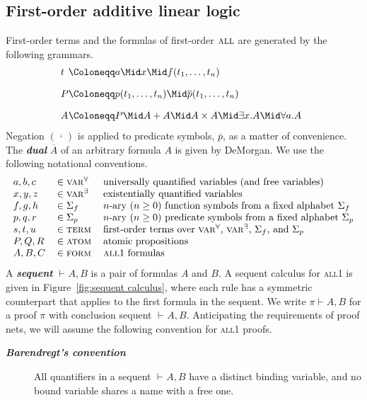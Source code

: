 \documentclass[UKenglish]{lipics-v2016}
\theoremstyle{plain}
\newcommand\defn[1]{\textit{\textbf{#1}}}
\newcommand\varA{\textsc{var}^\forall}
\newcommand\varE{\textsc{var}^\exists}
\newcommand\terms{\textsc{term}}
\newcommand\termsA{\textsc{term}^\forall}
\newcommand\atom{\textsc{atom}}
\newcommand\form{\textsc{form}}
\newcommand\all{\textsc{all}}
\newcommand\+{+}
\renewcommand\*{\times}
\newcommand\dual[1]{\overline{#1}}
\newcommand\seq[3][]{{\vdash_{#1}}#2,#3}
\newcommand\prf[3]{#1\vdash\!#2,#3}
\begin{document}


\subsection{First-order additive linear logic}

First-order terms and the formulas of first-order $\all$ are generated by the following grammars.
%
\setMidspace{5pt}
\[
\begin{array}{@{}l@{}l}
	t &\Coloneqq a \Mid x \Mid f(t_1,\dots,t_n)
\\[10pt]
	P &\Coloneqq p(t_1,\dots,t_n) \Mid \dual p(t_1,\dots,t_n)
\\[10pt]
	A &\Coloneqq P \Mid A\+A \Mid A\*A \Mid \exists x.A \Mid \forall a.A
\end{array}
\]
%
Negation $(\dual{\,\cdot\,})$ is applied to predicate symbols, $\dual p$, as a matter of convenience. The \defn{dual} $\dual A$ of an arbitrary formula $A$ is given by DeMorgan. We use the following notational conventions.
%
\[
\begin{tabular}{@{}lll@{}}
	$a,b,c$ & $\in \varA$ 		& universally quantified variables (and free variables)\\
	$x,y,z$ & $\in \varE$		& existentially quantified variables \\
	$f,g,h$ & $\in \Sigma_f$	& $n$-ary $(n\geq 0)$ function symbols from a fixed alphabet $\Sigma_f$\\
	$p,q,r$ & $\in \Sigma_p$	& $n$-ary $(n\geq 0)$ predicate symbols from a fixed alphabet $\Sigma_p$ \\
	$s,t,u$ & $\in \terms$ 		& first-order terms over $\varA$, $\varE$, $\Sigma_f$, and $\Sigma_p$ \\
	$P,Q,R$ & $\in \atom$		& atomic propositions \\
	$A,B,C$ & $\in \form$		& \all1 formulas \\
\end{tabular}
\]
%
A \defn{sequent} $\seq AB$ is a pair of formulas $A$ and $B$. A sequent calculus for \all1 is given in Figure~\ref{fig:sequent calculus}, where each rule has a symmetric counterpart that applies to the first formula in the sequent. We write $\prf\pi AB$ for a proof $\pi$ with conclusion sequent $\seq AB$. Anticipating the requirements of proof nets, we will assume the following convention for \all1 proofs.

\begin{description}
	\item
[\defn{Barendregt's convention}] All quantifiers in a sequent $\seq AB$ have a distinct binding variable, and no bound variable shares a name with a free one.
\end{description}
\end{document}
